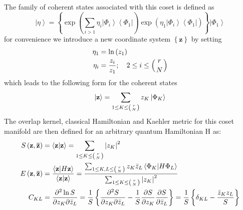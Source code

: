 \documentclass[aps,preprint]{revtex4}%
\begin{document}
The family of coherent states associated with this coset is defined as
\begin{equation}
\left\vert \eta\right\rangle =\left\{  \exp\left(  \sum_{i>1}\eta
_{i}\left\vert \Phi_{i}\right\rangle \left\langle \Phi_{1}\right\vert \right)
\exp\left(  \eta_{1}\left\vert \Phi_{i}\right\rangle \left\langle \Phi
_{1}\right\vert \right)  \right\}  \left\vert \Phi_{1}\right\rangle
\end{equation}
for convenience we introduce a new coordinate system $\left\{  \mathbf{z}%
\right\}  $ by setting
\begin{align}
\eta_{1}  &  =\ln\left(  z_{1}\right) \\
\eta_{i}  &  =\frac{z_{i}}{z_{1}};\quad2\leq i\leq\left(
\genfrac{}{}{0pt}{}{r}{N}%
\right)
\end{align}
which leads to the following form for the coherent states
\begin{equation}
\left\vert \mathbf{z}\right\rangle =\sum_{1\leq K\leq\left(
\genfrac{}{}{0pt}{}{r}{N}%
\right)  }z_{K}\left\vert \Phi_{K}\right\rangle
\end{equation}
The overlap kernel, classical Hamiltonian and Kaehler metric for this coset
manifold are then defined for an arbitrary quantum Hamiltonian H as:%
\begin{align}
S\left(  \mathbf{z,\bar{z}}\right)   &  =\left\langle \mathbf{z|z}%
\right\rangle =\sum_{1\leq K\leq\left(
\genfrac{}{}{0pt}{}{r}{N}%
\right)  }\left\vert z_{K}\right\vert ^{2}\\
E\left(  \mathbf{z,\bar{z}}\right)   &  =\frac{\left\langle \mathbf{z|}%
H\mathbf{z}\right\rangle }{\left\langle \mathbf{z|z}\right\rangle }=\frac
{\sum_{1\leq K,L\leq\left(
\genfrac{}{}{0pt}{}{r}{N}%
\right)  }z_{K}\bar{z}_{L}\left\langle \Phi_{K}\mathbf{|}H\Phi_{L}%
\right\rangle }{\sum_{1\leq K\leq\left(
\genfrac{}{}{0pt}{}{r}{N}%
\right)  }\left\vert z_{K}\right\vert ^{2}}\\
C_{KL}  &  =\frac{\partial^{2}\ln S}{\partial z_{K}\partial\bar{z}_{L}}%
=\frac{1}{S}\left\{  \frac{\partial^{2}S}{\partial z_{K}\partial\bar{z}_{L}%
}-\frac{1}{S}\frac{\partial S}{\partial z_{K}}\frac{\partial S}{\partial
\bar{z}_{L}}\right\}  =\frac{1}{S}\left\{  \delta_{KL}-\frac{\bar{z}_{K}z_{L}%
}{S}\right\}
\end{align}
\end{document}
